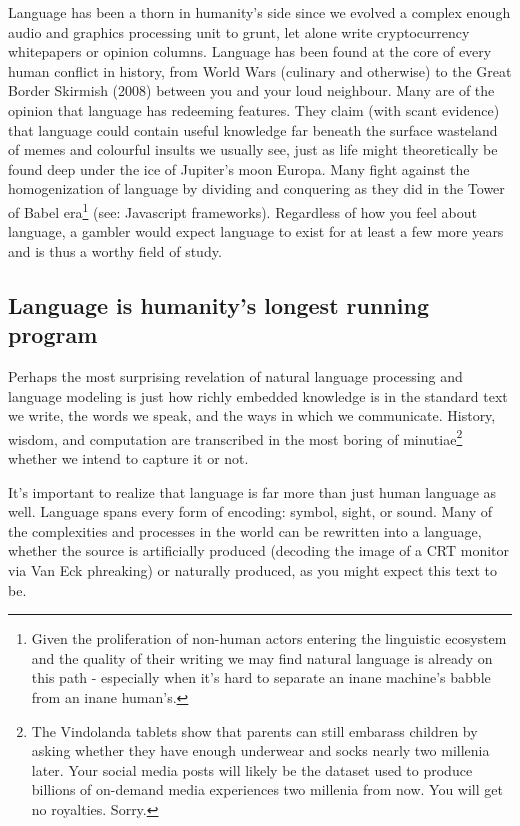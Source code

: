 \documentclass{article}
\begin{document}
Language has been a thorn in humanity's side since we evolved a complex enough audio and graphics processing unit to grunt, let alone write cryptocurrency whitepapers or opinion columns.
Language has been found at the core of every human conflict in history, from World Wars (culinary and otherwise) to the Great Border Skirmish (2008) between you and your loud neighbour.
Many are of the opinion that language has redeeming features.
They claim (with scant evidence) that language could contain useful knowledge far beneath the surface wasteland of memes and colourful insults we usually see, just as life might theoretically be found deep under the ice of Jupiter's moon Europa.
Many fight against the homogenization of language by dividing and conquering as they did in the Tower of Babel era\footnote{Given the proliferation of non-human actors entering the linguistic ecosystem and the quality of their writing we may find natural language is already on this path - especially when it's hard to separate an inane machine's babble from an inane human's.} (see: Javascript frameworks).
Regardless of how you feel about language, a gambler would expect language to exist for at least a few more years and is thus a worthy field of study.

\subsection{Language is humanity's longest running program}

Perhaps the most surprising revelation of natural language processing and language modeling is just how richly embedded knowledge is in the standard text we write, the words we speak, and the ways in which we communicate.
History, wisdom, and computation are transcribed in the most boring of minutiae\footnote{The Vindolanda tablets show that parents can still embarass children by asking whether they have enough underwear and socks nearly two millenia later. Your social media posts will likely be the dataset used to produce billions of on-demand media experiences two millenia from now. You will get no royalties. Sorry.} whether we intend to capture it or not.

It's important to realize that language is far more than just human language as well.
Language spans every form of encoding: symbol, sight, or sound.
Many of the complexities and processes in the world can be rewritten into a language, whether the source is artificially produced (decoding the image of a CRT monitor via Van Eck phreaking) or naturally produced, as you might expect this text to be.
\end{document}
